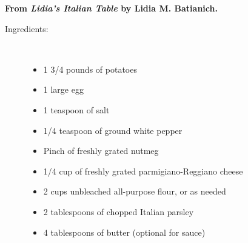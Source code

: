 \documentclass[11pt,letterpaper]{article}
\begin{document}


\begin{flushright}
{\bf From {\it Lidia's Italian Table} by Lidia M. Batianich.}
\end{flushright}

\begin{description}

\item[Ingredients:]\ \\
	\begin{itemize}
	\item 1 3/4 pounds of potatoes 
	\item 1 large egg
	\item 1 teaspoon of salt 
	\item 1/4 teaspoon of ground white pepper 
	\item Pinch of freshly grated nutmeg
	\item 1/4 cup of freshly grated parmigiano-Reggiano cheese 
	\item 2 cups unbleached all-purpose flour, or as needed
	\item 2 tablespoons of chopped Italian parsley 
	\item 4 tablespoons of butter (optional for sauce)
	\end{itemize}


\end{description}
\end{document}
